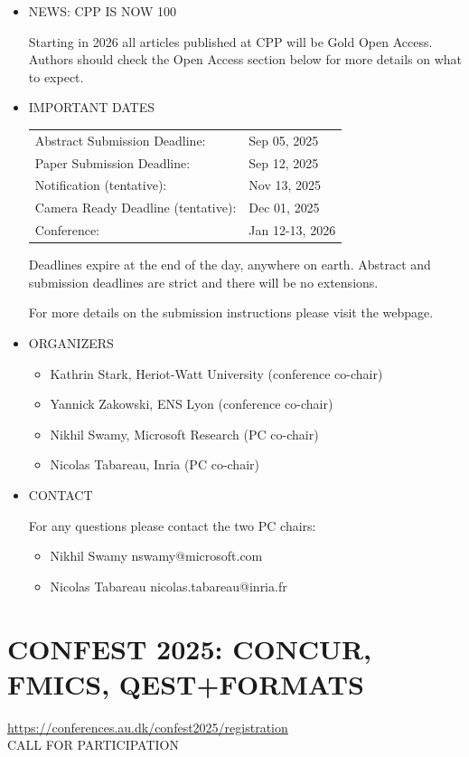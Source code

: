 \documentclass[prodmode,acmtecs]{acmsmall} %
\begin{document}
\begin{itemize}\item  NEWS: CPP IS NOW 100%
 
 Starting in 2026 all articles published at CPP will be Gold Open Access. Authors should check the Open Access section below for more details on what to expect. 
 
\item  IMPORTANT DATES 
 
\begin{tabulary}{\linewidth}{LL}Abstract Submission Deadline:  & Sep 05, 2025 \\
Paper Submission Deadline:  & Sep 12, 2025 \\
Notification (tentative):  & Nov 13, 2025 \\
Camera Ready Deadline (tentative):  & Dec 01, 2025 \\
Conference:  & Jan 12-13, 2026 \\
\end{tabulary}
 
  Deadlines expire at the end of the day, anywhere on earth. Abstract and submission deadlines are strict and there will be no extensions. 
 
  For more details on the submission instructions please visit the webpage.  
 
\item  ORGANIZERS 
 
\begin{itemize}\item  Kathrin Stark, Heriot-Watt University (conference co-chair)
\item  Yannick Zakowski, ENS Lyon (conference co-chair)
\item  Nikhil Swamy, Microsoft Research (PC co-chair)
\item  Nicolas Tabareau, Inria (PC co-chair)
\end{itemize} 
\item  CONTACT 
 
  For any questions please contact the two PC chairs: 
 
\begin{itemize}\item  Nikhil Swamy nswamy@microsoft.com
\item  Nicolas Tabareau nicolas.tabareau@inria.fr
\end{itemize} 
\end{itemize}\section{CONFEST 2025: CONCUR, FMICS, QEST+FORMATS }\label{CONFEST2025}  \href{https://conferences.au.dk/confest2025/registration}{https://conferences.au.dk/confest2025/registration}\\ 
CALL FOR PARTICIPATION 
\end{document}
